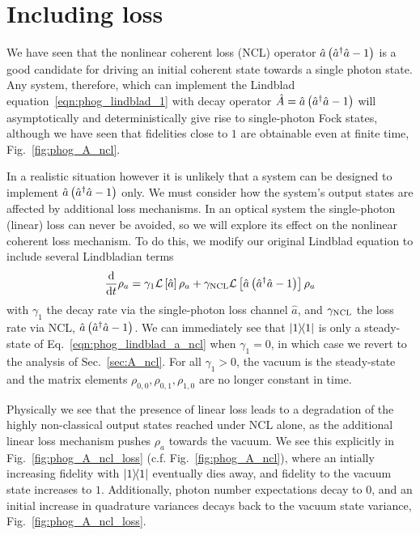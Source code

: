 \FloatBarrier
\section{Including loss}\label{sec:phog_including_loss}
We have seen that the nonlinear coherent loss (NCL) operator $\hat{a}\left(\hat{a}^\dagger \hat{a} - 1\right)$ is a good candidate for driving an initial coherent state towards a single photon state. Any system, therefore, which can implement the Lindblad equation~\ref{eqn:phog_lindblad_1} with decay operator $\hat{A} = \hat{a}\left(\hat{a}^\dagger \hat{a} - 1\right)$ will asymptotically and deterministically give rise to single-photon Fock states, although we have seen that fidelities close to $1$ are obtainable even at finite time, Fig.~\ref{fig:phog_A_ncl}. 

In a realistic situation however it is unlikely that a system can be designed to implement $\hat{a}\left(\hat{a}^\dagger \hat{a} - 1\right)$ only. We must consider how the system's output states are affected by additional loss mechanisms. In an optical system the single-photon (linear) loss can never be avoided, so we will explore its effect on the nonlinear coherent loss mechanism. To do this, we modify our original Lindblad equation to include several Lindbladian terms
\begin{equation}\label{eqn:phog_lindblad_a_ncl}
\frac{\mathrm{d}}{\mathrm{d}t} \rho_a =  \gamma_1 \mathcal{L}\left[\hat{a}\right]\rho_a + \gamma_{\text{NCL}} \mathcal{L}\left[\hat{a}\left(\hat{a}^\dagger \hat{a} - 1\right)\right]\rho_a
\end{equation}
with $\gamma_1$ the decay rate via the single-photon loss channel $\hat{a}$, and $\gamma_{\text{NCL}}$ the loss rate via NCL, $\hat{a}\left(\hat{a}^\dagger \hat{a} - 1\right)$. We can immediately see that $\dyad{1}$ is only a steady-state of Eq.~\ref{eqn:phog_lindblad_a_ncl} when $\gamma_1 = 0$, in which case we revert to the analysis of Sec.~\ref{sec:A_ncl}. For all $\gamma_1 > 0$, the vacuum is the steady-state and the matrix elements $\rho_{0, 0}, \rho_{0, 1}, \rho_{1, 0}$ are no longer constant in time. 

Physically we see that the presence of linear loss leads to a degradation of the highly non-classical output states reached under NCL alone, as the additional linear loss mechanism pushes $\rho_a$ towards the vacuum. We see this explicitly in Fig.~\ref{fig:phog_A_ncl_loss} (c.f. Fig.~\ref{fig:phog_A_ncl}), where an intially increasing fidelity with $\dyad{1}$ eventually dies away, and fidelity to the vacuum state increases to $1$. Additionally, photon number expectations decay to $0$, and an initial increase in quadrature variances decays back to the vacuum state variance, Fig.~\ref{fig:phog_A_ncl_loss}.





